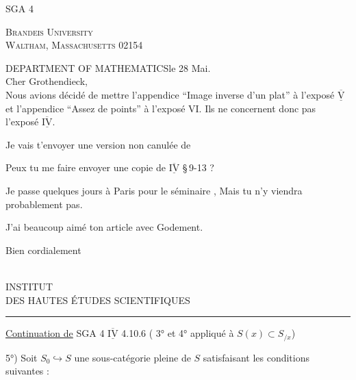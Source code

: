 \begin{flushright}
SGA 4
\end{flushright}

\begin{center}
\textsc{Brandeis University}\\
\textsc{Waltham, Massachusetts 02154}
\end{center}
\noindent DEPARTMENT OF MATHEMATICS\hfill le 28 Mai.\\

Cher Grothendieck,\\

Nous avions décidé de mettre l'appendice ``Image inverse d'un plat'' à l'exposé $\underline{\overline{\mathrm{V}}}$ et l'appendice ``Assez de points'' à l'exposé VI. Ils ne concernent donc pas l'exposé $\underline{\overline{\mathrm{IV}}}$.

Je vais t'envoyer une version non canulée de  

Peux tu me faire envoyer une copie de $\underline{\overline{\mathrm{IV}}}$ \S\,9-13 ?

Je passe quelques jours à Paris pour le \unsure{:}  séminaire , Mais tu n'y viendra probablement pas.

J'ai beaucoup aimé ton article avec Godement.

\begin{flushright}
Bien cordialement\\
\\
\end{flushright}

\begin{center}
INSTITUT\\
DES HAUTES ÉTUDES SCIENTIFIQUES\\
\rule{2.3em}{0.4pt}
\end{center}

\uline{Continuation de} SGA 4 $\underline{\overline{\mathrm{IV}}}$ 4.10.6 ( 3° et 4°\unsure{)} appliqué à $S(x)\subset S_{/x}$)

5°) Soit $S_0\hookrightarrow S$ une  sous-catégorie pleine de $S$ satisfaisant les conditions suivantes :

